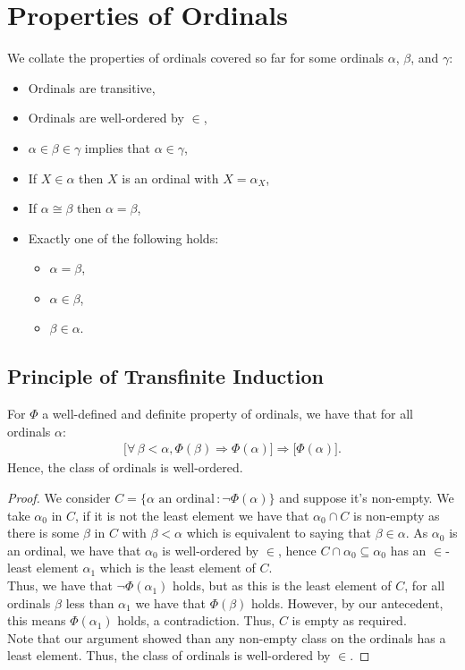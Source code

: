\section{Properties of Ordinals}

We collate the properties of ordinals covered so far
for some ordinals $\alpha$, $\beta$, and $\gamma$:
\begin{itemize}
    \item Ordinals are transitive,
    \item Ordinals are well-ordered by $\in$,
    \item $\alpha \in \beta \in \gamma$ implies that $\alpha \in \gamma$,
    \item If $X \in \alpha$ then $X$ is an ordinal with $X = \alpha_X$,
    \item If $\alpha \cong \beta$ then $\alpha = \beta$,
    \item Exactly one of the following holds: \begin{itemize}
        \item $\alpha = \beta$,
        \item $\alpha \in \beta$,
        \item $\beta \in \alpha$.
    \end{itemize}
\end{itemize}

\subsection{Principle of Transfinite Induction}

For $\Phi$ a well-defined and definite property of ordinals, we have
that for all ordinals $\alpha$: \begin{align*}
    \bigl[
        \forall \, \beta < \alpha, \Phi(\beta) 
        \Rightarrow \Phi(\alpha)
    \bigr] \Rightarrow
    \bigl[
        \Phi(\alpha)
    \bigr].
\end{align*} Hence, the class of ordinals is well-ordered.

\begin{proof}
    We consider $C = \{\alpha \text{ an ordinal} \, : \neg \Phi(\alpha)\}$
    and suppose it's non-empty. We take $\alpha_0$ in $C$, if it is not
    the least element we have that $\alpha_0 \cap C$ is non-empty
    as there is some $\beta$ in $C$ with $\beta < \alpha$ which
    is equivalent to saying that $\beta \in \alpha$.
    As $\alpha_0$ is an ordinal, we have that $\alpha_0$ is well-ordered
    by $\in$, hence $C \cap \alpha_0 \subseteq \alpha_0$ has an
    $\in$-least element $\alpha_1$ which is the least element of $C$.
    \\[\baselineskip]
    Thus, we have that $\neg \Phi(\alpha_1)$ holds, but as this is
    the least element of $C$, for all ordinals $\beta$ less than $\alpha_1$
    we have that $\Phi(\beta)$ holds. However, by our antecedent, this
    means $\Phi(\alpha_1)$ holds, a contradiction. Thus, $C$ is empty
    as required.
    \\[\baselineskip]
    Note that our argument showed than any non-empty class on
    the ordinals has a least element. Thus, the class of ordinals
    is well-ordered by $\in$.
\end{proof}

